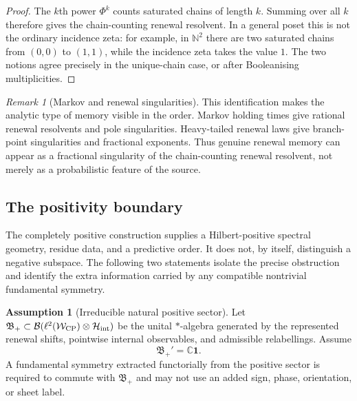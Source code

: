 \documentclass[11pt]{article}
\theoremstyle{definition}
\newtheorem{assumption}{Assumption}[section]
\theoremstyle{remark}
\newtheorem{remark}[theorem]{Remark}
\newcommand{\N}{\mathbb{N}}
\newcommand{\C}{\mathbb{C}}
\newcommand{\Hh}{\mathcal{H}}
\newcommand{\W}{\mathcal{W}}
\newcommand{\CP}{\mathrm{CP}}
\newcommand{\one}{\mathbf{1}}
\begin{document}
\begin{proof}
The $k$th power $\Phi^k$ counts saturated chains of length $k$.  Summing over all
$k$ therefore gives the chain-counting renewal resolvent.  In a general poset
this is not the ordinary incidence zeta: for example, in $\N^2$ there are two
saturated chains from $(0,0)$ to $(1,1)$, while the incidence zeta takes the
value $1$.  The two notions agree precisely in the unique-chain case, or after
Booleanising multiplicities.
\end{proof}

\begin{remark}[Markov and renewal singularities]
\label{rem:markov-renewal}
This identification makes the analytic type of memory visible in the order.
Markov holding times give rational renewal resolvents and pole singularities.
Heavy-tailed renewal laws give branch-point singularities and fractional
exponents.  Thus genuine renewal memory can appear as a fractional singularity
of the chain-counting renewal resolvent, not merely as a probabilistic feature of
the source.
\end{remark}




\subsection{The positivity boundary}
\label{sec:positive-obstruction}

The completely positive construction supplies a Hilbert-positive spectral
geometry, residue data, and a predictive order.  It does not, by itself,
distinguish a negative subspace.  The following two statements isolate the
precise obstruction and identify the extra information carried by any compatible
nontrivial fundamental symmetry.

\begin{assumption}[Irreducible natural positive sector]
\label{ass:irreducible-positive-sector}
Let \(\mathfrak B_+\subset\mathcal B(\ell^2(\W_{\CP})\otimes\Hh_{\rm int})\)
be the unital \(*\)-algebra generated by the represented renewal shifts,
pointwise internal observables, and admissible relabellings.  Assume
\[
  \mathfrak B_+'=\C\one.
\]
A fundamental symmetry extracted functorially from the positive sector is
required to commute with \(\mathfrak B_+\) and may not use an added sign, phase,
orientation, or sheet label.
\end{assumption}
\end{document}
